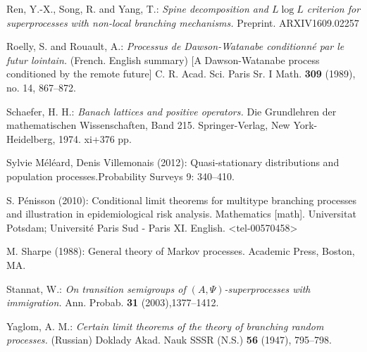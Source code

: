 \documentclass[12pt,a4paper]{amsart}
\numberwithin{equation}{section}
\theoremstyle{plain}
\theoremstyle{definition}
\theoremstyle{remark}
\begin{document}
\begin{thebibliography}{99}
Ren, Y.-X., Song, R. and Yang, T.:
\emph{Spine decomposition and {$ L\log L $} criterion for superprocesses with non-local branching mechanisms.}
Preprint.
ARXIV{1609.02257}

Roelly, S. and Rouault, A.:
\emph{Processus de Dawson-Watanabe conditionn\'e par le futur lointain.} (French. English summary) [A Dawson-Watanabe process conditioned by the remote future]
C. R. Acad. Sci. Paris Sr. I Math. \textbf{309} (1989), no. 14, 867--872.

Schaefer, H. H.:
\emph{Banach lattices and positive operators.}
Die Grundlehren der mathematischen Wissenschaften, Band 215. Springer-Verlag, New York-Heidelberg, 1974. xi+376 pp. 

Sylvie M\'el\'eard, Denis Villemonais (2012): Quasi-stationary distributions and
population processes.Probability Surveys 9: 340--410.

 S. P\'enisson (2010): Conditional limit theorems for multitype branching
processes and illustration in epidemiological risk analysis. Mathematics [math]. Universit\:at Potsdam; Universit\'e Paris Sud - Paris
XI. English. <tel-00570458>

 M. Sharpe (1988): General theory of Markov processes. Academic Press, Boston, MA.

Stannat, W.: \emph{On transition semigroups of $(A,\Psi)$-superprocesses with immigration.} Ann. Probab. \textbf{31} (2003),1377--1412.




Yaglom, A. M.:
\emph{Certain limit theorems of the theory of branching random processes.} (Russian)
Doklady Akad. Nauk SSSR (N.S.) \textbf{56} (1947), 795--798.

\end{thebibliography}
\end{document}
